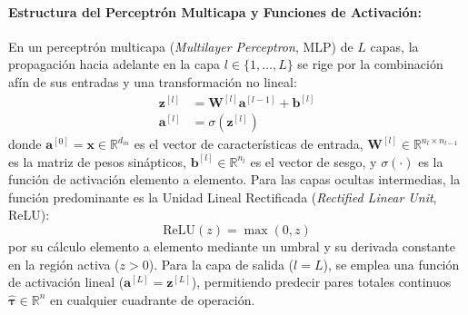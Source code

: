 \documentclass[12pt]{article}
\begin{document}
\paragraph{Estructura del Perceptrón Multicapa y Funciones de Activación:}
En un perceptrón multicapa (\textit{Multilayer Perceptron}, MLP) de $L$ capas, la propagación hacia adelante en la capa $l \in \{1, \dots, L\}$ se rige por la combinación afín de sus entradas y una transformación no lineal:
\begin{align}
\bm{z}^{[l]} &= \bm{W}^{[l]} \bm{a}^{[l-1]} + \bm{b}^{[l]} \label{eq:mlp_z} \\
\bm{a}^{[l]} &= \sigma(\bm{z}^{[l]}) \label{eq:mlp_a}
\end{align}
donde $\bm{a}^{[0]} = \bm{x} \in \mathbb{R}^{d_{in}}$ es el vector de características de entrada, $\bm{W}^{[l]} \in \mathbb{R}^{n_l \times n_{l-1}}$ es la matriz de pesos sinápticos, $\bm{b}^{[l]} \in \mathbb{R}^{n_l}$ es el vector de sesgo, y $\sigma(\cdot)$ es la función de activación elemento a elemento. Para las capas ocultas intermedias, la función predominante es la Unidad Lineal Rectificada (\textit{Rectified Linear Unit}, ReLU):
\begin{equation}
\text{ReLU}(z) = \max(0, z)
\label{eq:relu_func}
\end{equation}
por su cálculo elemento a elemento mediante un umbral y su derivada constante en la región activa ($z > 0$). Para la capa de salida ($l = L$), se emplea una función de activación lineal ($\bm{a}^{[L]} = \bm{z}^{[L]}$), permitiendo predecir pares totales continuos $\hat{\bm{\tau}} \in \mathbb{R}^n$ en cualquier cuadrante de operación.
\end{document}
